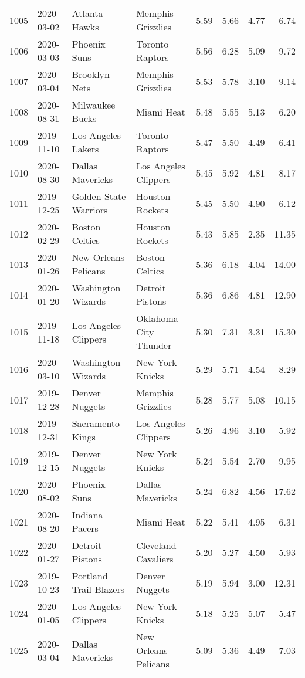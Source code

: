 \documentclass[
  11pt,
]{article}
\theoremstyle{nonumberplain}
\begin{document}
\begin{longtable}{rl|llr|rrr}
1005 & 2020-03-02 & Atlanta Hawks & Memphis Grizzlies & 5.59 & 5.66 & 4.77 & 6.74\\
1006 & 2020-03-03 & Phoenix Suns & Toronto Raptors & 5.56 & 6.28 & 5.09 & 9.72\\
1007 & 2020-03-04 & Brooklyn Nets & Memphis Grizzlies & 5.53 & 5.78 & 3.10 & 9.14\\
1008 & 2020-08-31 & Milwaukee Bucks & Miami Heat & 5.48 & 5.55 & 5.13 & 6.20\\
1009 & 2019-11-10 & Los Angeles Lakers & Toronto Raptors & 5.47 & 5.50 & 4.49 & 6.41\\
1010 & 2020-08-30 & Dallas Mavericks & Los Angeles Clippers & 5.45 & 5.92 & 4.81 & 8.17\\
1011 & 2019-12-25 & Golden State Warriors & Houston Rockets & 5.45 & 5.50 & 4.90 & 6.12\\
1012 & 2020-02-29 & Boston Celtics & Houston Rockets & 5.43 & 5.85 & 2.35 & 11.35\\
1013 & 2020-01-26 & New Orleans Pelicans & Boston Celtics & 5.36 & 6.18 & 4.04 & 14.00\\
1014 & 2020-01-20 & Washington Wizards & Detroit Pistons & 5.36 & 6.86 & 4.81 & 12.90\\
1015 & 2019-11-18 & Los Angeles Clippers & Oklahoma City Thunder & 5.30 & 7.31 & 3.31 & 15.30\\
1016 & 2020-03-10 & Washington Wizards & New York Knicks & 5.29 & 5.71 & 4.54 & 8.29\\
1017 & 2019-12-28 & Denver Nuggets & Memphis Grizzlies & 5.28 & 5.77 & 5.08 & 10.15\\
1018 & 2019-12-31 & Sacramento Kings & Los Angeles Clippers & 5.26 & 4.96 & 3.10 & 5.92\\
1019 & 2019-12-15 & Denver Nuggets & New York Knicks & 5.24 & 5.54 & 2.70 & 9.95\\
1020 & 2020-08-02 & Phoenix Suns & Dallas Mavericks & 5.24 & 6.82 & 4.56 & 17.62\\
1021 & 2020-08-20 & Indiana Pacers & Miami Heat & 5.22 & 5.41 & 4.95 & 6.31\\
1022 & 2020-01-27 & Detroit Pistons & Cleveland Cavaliers & 5.20 & 5.27 & 4.50 & 5.93\\
1023 & 2019-10-23 & Portland Trail Blazers & Denver Nuggets & 5.19 & 5.94 & 3.00 & 12.31\\
1024 & 2020-01-05 & Los Angeles Clippers & New York Knicks & 5.18 & 5.25 & 5.07 & 5.47\\
1025 & 2020-03-04 & Dallas Mavericks & New Orleans Pelicans & 5.09 & 5.36 & 4.49 & 7.03\\

\end{longtable}
\end{document}
